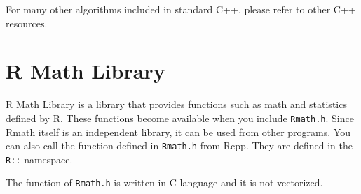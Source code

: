 \documentclass[]{book}
\begin{document}
For many other algorithms included in standard C++, please refer to other C++ resources.

\hypertarget{r-math-library}{%
\chapter{R Math Library}\label{r-math-library}}

R Math Library is a library that provides functions such as math and statistics defined by R. These functions become available when you include \texttt{Rmath.h}. Since Rmath itself is an independent library, it can be used from other programs. You can also call the function defined in \texttt{Rmath.h} from Rcpp. They are defined in the \texttt{R::} namespace.

The function of \texttt{Rmath.h} is written in C language and it is not vectorized.
\end{document}
